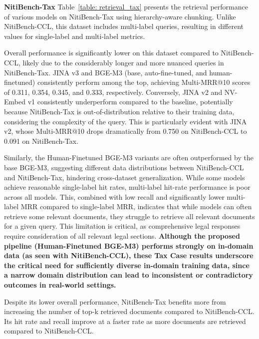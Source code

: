 \textbf{NitiBench-Tax} Table~\ref{table: retrieval_tax} presents the retrieval performance of various models on NitiBench-Tax using hierarchy-aware chunking. 
%
Unlike NitiBench-CCL, this dataset includes multi-label queries, resulting in different values for single-label and multi-label metrics.

Overall performance is significantly lower on this dataset compared to NitiBench-CCL, likely due to the considerably longer and more nuanced queries in NitiBench-Tax.
%
JINA v3 and BGE-M3 (base, auto-fine-tuned, and human-finetuned) consistently perform among the top, achieving Multi-MRR@10 scores of 0.311, 0.354, 0.345, and 0.333, respectively. 
%
Conversely, JINA v2 and NV-Embed v1 consistently underperform compared to the baseline, potentially because NitiBench-Tax is out-of-distribution relative to their training data, considering the complexity of the query.
%
This is particularly evident with JINA v2, whose Multi-MRR@10 drops dramatically from 0.750 on NitiBench-CCL to 0.091 on NitiBench-Tax.

Similarly, the Human-Finetuned BGE-M3 variants are often outperformed by the base BGE-M3, suggesting different data distributions between NitiBench-CCL and NitiBench-Tax, hindering cross-dataset generalization. 
%
While some models achieve reasonable single-label hit rates, multi-label hit-rate performance is poor across all models. 
%
This, combined with low recall and significantly lower multi-label MRR compared to single-label MRR, indicates that while models can often retrieve some relevant documents, they struggle to retrieve all relevant documents for a given query. 
%
This limitation is critical, as comprehensive legal responses require consideration of all relevant legal sections. 
%
\textbf{Although the proposed pipeline (Human-Finetuned BGE-M3) performs strongly on in-domain data (as seen with NitiBench-CCL), these Tax Case results underscore the critical need for sufficiently diverse in-domain training data, since a narrow domain distribution can lead to inconsistent or contradictory outcomes in real-world settings.}

Despite its lower overall performance, NitiBench-Tax benefits more from increasing the number of top-k retrieved documents compared to NitiBench-CCL. 
%
Its hit rate and recall improve at a faster rate as more documents are retrieved compared to NitiBench-CCL.

